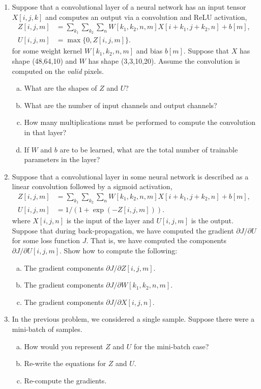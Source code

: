 \documentclass[11pt]{article}
\begin{document}
\begin{enumerate}
\item Suppose that a convolutional layer of a neural network has an input tensor $X[i,j,k]$ and computes
an output via a convolution and ReLU activation,
\begin{align*}
    Z[i,j,m] &= \sum_{k_1} \sum_{k_2} \sum_n W[k_1,k_2,n,m]X[i+k_1,j+k_2,n] + b[m], \\
    U[i,j,m] &= \max\{0, Z[i,j,m] \}.
\end{align*}
for some weight kernel $W[k_1,k_2,n,m]$ and bias $b[m]$.  Suppose that $X$ has shape (48,64,10) and $W$ has shape (3,3,10,20).
Assume the convolution is computed on the \emph{valid} pixels.
\begin{enumerate}[(a)]
\item What are the shapes of $Z$ and $U$?
\item What are the number of input channels and output channels?
\item How many multiplications must be performed to compute the convolution in that layer?
\item If $W$ and $b$ are to be learned, what are the total number of trainable parameters in the layer?
\end{enumerate}

\item Suppose that a convolutional layer in some neural network
is described as a linear convolution followed by a sigmoid activation,
\begin{align*}
    Z[i,j,m] &= \sum_{k_1} \sum_{k_2} \sum_n W[k_1,k_2,n,m]X[i+k_1,j+k_2,n] + b[m], \\
    U[i,j,m] &= 1/(1+\exp(-Z[i,j,m])).
\end{align*}
where $X[i,j,n]$ is the input of the layer and $U[i,j,m]$ is the output.
Suppose that during back-propagation, we have computed the gradient $\partial J/\partial U$ for some loss function $J$.
That is, we have computed  the components $\partial J/\partial U[i,j,m]$.  Show how to compute the following:
\begin{enumerate}[(a)]
\item The gradient components $\partial J/\partial Z[i,j,m]$.
\item The gradient components $\partial J/\partial W[k_1,k_2,n,m]$.
\item The gradient components $\partial J/\partial X[i,j,n]$.
\end{enumerate}

\item 
In the previous problem, we considered a single sample.
Suppose there were a mini-batch of samples.
\begin{enumerate}[(a)]
\item How would you represent $Z$ and $U$ for the mini-batch case?
\item Re-write the equations for $Z$ and $U$.  
\item Re-compute the gradients.
\end{enumerate}
\end{enumerate}
\end{document}
